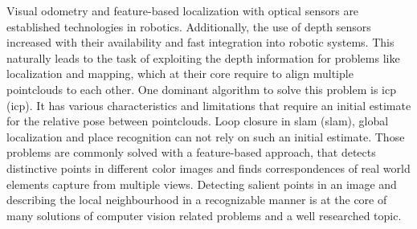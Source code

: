 Visual odometry\cite{he_tvc2019} and \gls{feature}-based localization with optical sensors\cite{sattler_cvpr2018} are established technologies in robotics.
Additionally, the use of depth sensors increased with their availability and fast integration into robotic systems.
This naturally leads to the task of exploiting the depth information for problems like localization and mapping, which at their core require to align multiple pointclouds to each other.
One dominant algorithm to solve this problem is \acrshort{icp} (\acrlong{icp})\cite{besl_pami1992}.
It has various characteristics and limitations that require an initial estimate for the relative pose between pointclouds\cite{rusinkiewicz_ieee2001}.
Loop closure in \acrshort{slam} (\acrlong{slam})\cite{ho_ros2006}, global localization and place recognition\cite{sattler_2011} can not rely on such an initial estimate.
Those problems are commonly solved with a \gls{feature}-based approach, that detects distinctive points in different color images and finds correspondences of real world elements capture from multiple views.
Detecting salient points in an image and describing the local neighbourhood in a recognizable manner is at the core of many solutions of computer vision related problems and a well researched topic\cite{andersson_2016}.

